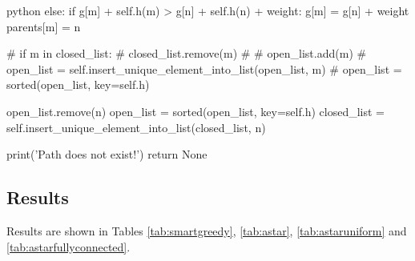 \begin{mintedbox}{python}
                else:
                    if g[m] + self.h(m) > g[n] + self.h(n) + weight:
                        g[m] = g[n] + weight
                        parents[m] = n

                        # if m in closed_list:
                        #     closed_list.remove(m)
                        #     # open_list.add(m)
                        #     open_list = self.insert_unique_element_into_list(open_list, m)
                        #     open_list = sorted(open_list, key=self.h)


            open_list.remove(n)
            open_list = sorted(open_list, key=self.h)
            closed_list = self.insert_unique_element_into_list(closed_list, n)

        print('Path does not exist!')
        return None
\end{mintedbox}

\subsection{Results}

Results are shown in Tables \ref{tab:smartgreedy}, \ref{tab:astar}, \ref{tab:astaruniform} and \ref{tab:astarfullyconnected}.









